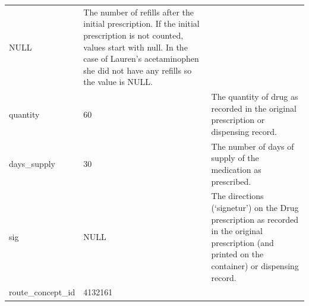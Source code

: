\documentclass[11pt]{book}
\theoremstyle{definition}
\theoremstyle{definition}
\theoremstyle{definition}
\theoremstyle{remark}
\begin{document}
\begin{longtable}[]{@{}lll@{}}
\begin{minipage}[t]{0.15\columnwidth}
NULL\strut
\end{minipage} & \begin{minipage}[t]{0.49\columnwidth}\raggedright
The number of refills after the initial prescription. If the initial prescription is not counted, values start with null. In the case of Lauren's acetaminophen she did not have any refills so the value is NULL.\strut
\end{minipage}\tabularnewline
\begin{minipage}[t]{0.28\columnwidth}\raggedright
quantity\strut
\end{minipage} & \begin{minipage}[t]{0.15\columnwidth}\raggedright
60\strut
\end{minipage} & \begin{minipage}[t]{0.49\columnwidth}\raggedright
The quantity of drug as recorded in the original prescription or dispensing record.\strut
\end{minipage}\tabularnewline
\begin{minipage}[t]{0.28\columnwidth}\raggedright
days\_supply\strut
\end{minipage} & \begin{minipage}[t]{0.15\columnwidth}\raggedright
30\strut
\end{minipage} & \begin{minipage}[t]{0.49\columnwidth}\raggedright
The number of days of supply of the medication as prescribed.\strut
\end{minipage}\tabularnewline
\begin{minipage}[t]{0.28\columnwidth}\raggedright
sig\strut
\end{minipage} & \begin{minipage}[t]{0.15\columnwidth}\raggedright
NULL\strut
\end{minipage} & \begin{minipage}[t]{0.49\columnwidth}\raggedright
The directions (`signetur') on the Drug prescription as recorded in the original prescription (and printed on the container) or dispensing record.\strut
\end{minipage}\tabularnewline
\begin{minipage}[t]{0.28\columnwidth}\raggedright
route\_concept\_id\strut
\end{minipage} & \begin{minipage}[t]{0.15\columnwidth}\raggedright
4132161\strut
\end{minipage} & \begin{minipage}[t]{0.49\columnwidth}\raggedright

\end{minipage}
\end{longtable}
\end{document}
